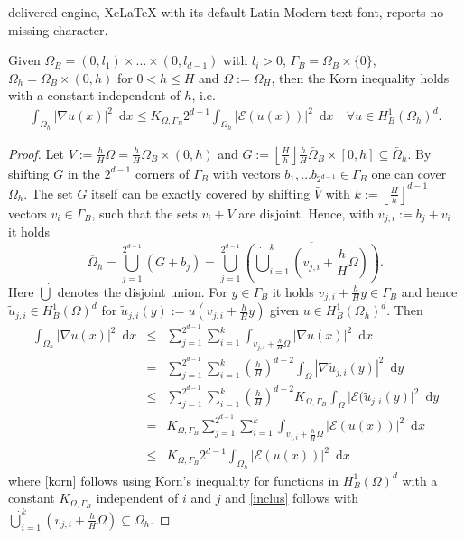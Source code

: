 \documentclass[10pt,a4paper]{amsart}
\newcommand{\dx}{\text{ d}x}
\newcommand{\dy}{\text{ d}y}
\begin{document}
delivered engine, XeLaTeX with its default Latin Modern text font, reports no missing character.
\begin{theorem}
  \label{kornIE}
  Given 
$\Omega_B=(0,l_1)\times \ldots \times (0,l_{d-1})$ with $l_i>0$, $ \Gamma_B=\Omega_B\times \{ 0 \}$, $\Omega_h=\Omega_B\times (0,h)$  for $0<h\leq H$ and $\Omega:=\Omega_H$, then the Korn inequality holds with a constant independent of $h$, i.e.
\begin{eqnarray}
  \int_{\Omega_h} |\nabla u(x)|^2 \, \dx
     \leq
  K_{\Omega,\Gamma_B } 2^ {d-1}\int_{\Omega_{h}} \lvert \mathcal{E}(u(x)) \rvert^2 \, \dx
\quad \forall u\in H^1_B(\Omega_h)^d .
  \label{kornNew}
\end{eqnarray}
\end{theorem}

\begin{proof}
  Let
  $V := \tfrac hH \Omega
  =  \tfrac hH \Omega_B \times (0,h) $
  and
  $ G:= \left\lfloor \frac{H}{h} \right\rfloor
  \tfrac hH \bar \Omega_B \times [0,h] 
  \subseteq \bar \Omega_h$.
  By shifting $G$ in the $2^{d-1}$ corners  of
  $\Gamma_B$ with vectors
  $b_1,\ldots b_{2^{d-1}}\in   \Gamma_B$
  one can cover  $\Omega_h$.
 The set $G$ itself can be exactly covered by shifting $\bar V$
 with
  $k := \left\lfloor \frac{H}{h} \right\rfloor^{d-1}$
  vectors
  $v_i \in \Gamma_B$, such that the sets
  $v_i +V$ are disjoint. 
  Hence, with $v_{j,i}:= b_j+v_i$ it holds
$$
\overline{\Omega}_h
= \bigcup_{j=1}^{2^{d-1}} { ( G+b_j) }
= \bigcup_{j=1}^{2^{d-1}} \overline{ (\dot{\bigcup}_{i=1}^{k} \left( v_{j,i} + \frac{h}{H} \Omega \right) )}
.
$$
Here \(\dot{\bigcup}\) denotes the disjoint union.
For $y \in \Gamma_B$ it holds
$v_{j,i} + \frac{h}{H} y\in \Gamma_B$ and hence
$\tilde{u}_{j,i} \in H^1_B(\Omega)^d $ for
$
\tilde{u}_{j,i}(y) :=u\left(v_{j,i} + \frac{h}{H} y\right)$ given $u\in H^1_B(\Omega_h)^d $. Then
\begin{eqnarray}
\int_{\Omega_h} |\nabla u(x)|^2 \, \dx
  &\leq& \sum_{j=1}^{2^{d-1}} \sum_{i=1}^{k} \int_{v_{j,i} + \frac{h}{H} \Omega} |\nabla u(x)|^2 \, \dx
\nonumber \\  &=&
\sum_{j=1}^{2^{d-1}} \sum_{i=1}^{k} \left( \frac{h}{H} \right)^{d-2} \int_{\Omega} |\nabla \tilde{u}_{j,i}(y)|^2 \, \dy 
\nonumber  \\
  &\leq& \sum_{j=1}^{2^{d-1}} \sum_{i=1}^{k} \left( \frac{h}{H} \right)^{d-2} K_{\Omega,\Gamma_B } \int_{\Omega} \lvert \mathcal{E}(\tilde{u}_{j,i}(y) \rvert^2 \, \dy
\label{korn}\\
&=& K_{\Omega,\Gamma_B }\sum_{j=1}^{2^{d-1}}  \sum_{i=1}^{k}  \int_{v_{j,i} + \frac{h}{H}\Omega} \lvert \mathcal{E}(u(x)) \rvert^2 \, \dx
\nonumber \\  &\leq &
K_{\Omega,\Gamma_B } 2^ {d-1}\int_{\Omega_{h}} \lvert \mathcal{E}(u(x)) \rvert^2 \, \dx
\label{inclus}
\end{eqnarray}
where \eqref{korn} follows using Korn's inequality for functions in $H^1_B(\Omega)^d $ with a constant $K_{\Omega,\Gamma_B }$ independent of $i$ and $j$ and \eqref{inclus} follows with $\dot\bigcup_{i=1}^{k} \left( v_{j, i} + \frac{h}{H} \Omega \right )  \subseteq \Omega_{h}$.
\end{proof}
\end{document}
